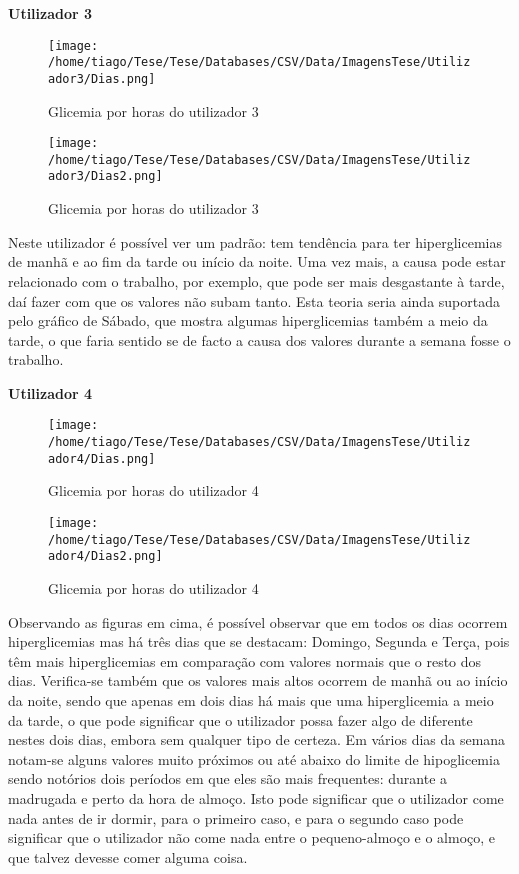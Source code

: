 \textbf{Utilizador 3}

\begin{figure}[H]
\centering
\texttt{[image: /home/tiago/Tese/Tese/Databases/CSV/Data/ImagensTese/Utilizador3/Dias.png]}
\caption{Glicemia por horas do utilizador 3}
\end{figure}

\begin{figure}[H]
\centering
\texttt{[image: /home/tiago/Tese/Tese/Databases/CSV/Data/ImagensTese/Utilizador3/Dias2.png]}
\caption{Glicemia por horas do utilizador 3}
\end{figure}


Neste utilizador é possível ver um padrão: tem tendência para ter hiperglicemias de manhã e ao fim da tarde ou início da noite. Uma vez mais, a causa pode estar relacionado com o trabalho, por exemplo, que pode ser mais desgastante à tarde, daí fazer com que os valores não subam tanto. Esta teoria seria ainda suportada pelo gráfico de Sábado, que mostra algumas hiperglicemias também a meio da tarde, o que faria sentido se de facto a causa dos valores durante a semana fosse o trabalho. 

\textbf{Utilizador 4}

\begin{figure}[H]
\centering
\texttt{[image: /home/tiago/Tese/Tese/Databases/CSV/Data/ImagensTese/Utilizador4/Dias.png]}
\caption{Glicemia por horas do utilizador 4}
\end{figure}

\begin{figure}[H]
\centering
\texttt{[image: /home/tiago/Tese/Tese/Databases/CSV/Data/ImagensTese/Utilizador4/Dias2.png]}
\caption{Glicemia por horas do utilizador 4}
\end{figure}


Observando as figuras em cima, é possível observar que em todos os dias ocorrem hiperglicemias mas há três dias que se destacam: Domingo, Segunda e Terça, pois têm mais hiperglicemias em comparação com valores normais que o resto dos dias. Verifica-se também que os valores mais altos ocorrem de manhã ou ao início da noite, sendo que apenas em dois dias há mais que uma hiperglicemia a meio da tarde, o que pode significar que o utilizador possa fazer algo de diferente nestes dois dias, embora sem qualquer tipo de certeza. 
Em vários dias da semana notam-se alguns valores muito próximos ou até abaixo do limite de hipoglicemia sendo notórios dois períodos em que eles são mais frequentes: durante a madrugada e perto da hora de almoço. Isto pode significar que o utilizador come nada antes de ir dormir, para o primeiro caso, e para o segundo caso pode significar que o utilizador não come nada entre o pequeno-almoço e o almoço, e que talvez devesse comer alguma coisa. 


